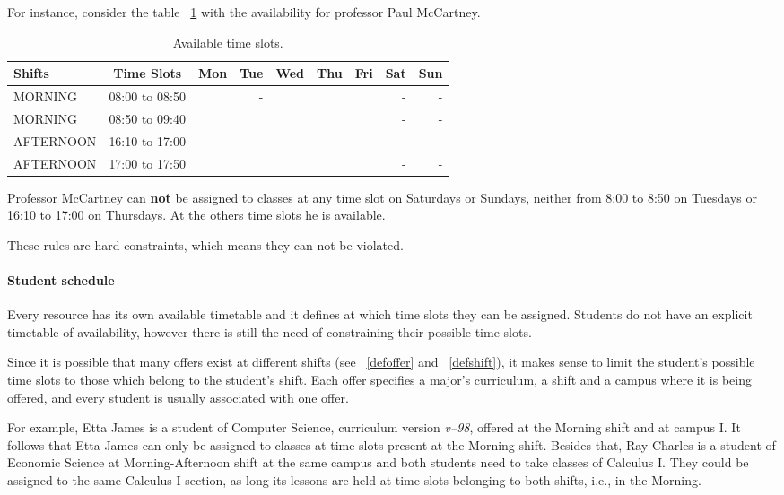 For instance, consider the table ~\ref{tab:availabMT} with the availability for professor Paul McCartney.

\begin{table}[H]
\centering
\begin{tabular}{l|c|r|r|r|r|r|r|r}
Shifts & Time Slots & Mon & Tue & Wed & Thu & Fri & Sat & Sun \\\hline
MORNING & 08:00 to 08:50 & & - & & & & - & - \\
MORNING & 08:50 to 09:40 & & & & & & - & - \\
AFTERNOON & 16:10 to 17:00 & & & & - & & - & - \\
AFTERNOON & 17:00 to 17:50 & & & & & & - & -
\end{tabular}
\caption{\label{tab:availabMT}Available time slots.}
\end{table}

Professor McCartney can \textbf{not} be assigned to classes at any time slot on Saturdays or Sundays, neither from 8:00 to 8:50 on Tuesdays or 16:10 to 17:00 on Thursdays. At the others time slots he is available.

These rules are hard constraints, which means they can not be violated.


\paragraph{Student schedule}
\label{constrstudentsched}

Every resource has its own available timetable and it defines at which time slots they can be assigned. Students do not have an explicit timetable of availability, however there is still the need of constraining their possible time slots.

Since it is possible that many offers exist at different shifts (see ~\ref{defoffer} and ~\ref{defshift}), it makes sense to limit the student's possible time slots to those which belong to the student's shift. Each offer specifies a major's curriculum, a shift and a campus where it is being offered, and every student is usually associated with one offer.

For example, Etta James is a student of Computer Science, curriculum version \textit{v--98}, offered at the Morning shift and at campus I. It follows that Etta James can only be assigned to classes at time slots present at the Morning shift. Besides that, Ray Charles is a student of Economic Science at Morning-Afternoon shift at the same campus and both students need to take classes of Calculus I. They could be assigned to the same Calculus I section, as long its lessons are held at time slots belonging to both shifts, i.e., in the Morning.


